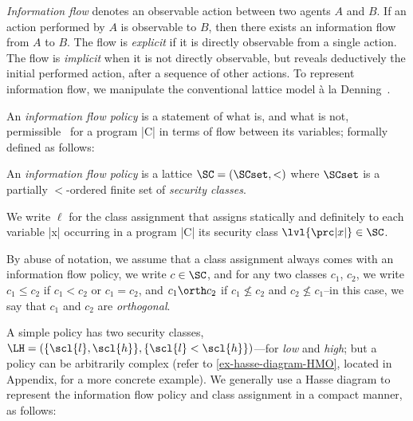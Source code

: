 \emph{Information flow} denotes an observable action between two agents \(A\) and \(B\).
If an action performed by \(A\) is observable to \(B\), then there exists an information flow from \(A\) to \(B\).
The flow is \emph{explicit} if it is directly observable from a single action.
The flow is \emph{implicit} when it is not directly observable, but reveals deductively the initial performed action, after a sequence of other actions.
To represent information flow, we manipulate the conventional lattice model à la Denning~\cite{Denning76}.

An \emph{information flow policy} is a statement of what is, and what is not, permissible~\cite{bishop2003} for a program \prc|C| in terms of flow between its variables; formally defined as follows: %

\begin{definition}%
\label{def:ifp}
An \emph{information flow policy} is a lattice \(\SC = (\SCset, <)\) where \(\SCset\) is a partially \(<\)-ordered finite set of \emph{security classes}.

We write \(\ell\) for the class assignment that assigns statically and definitely to each variable \prc|x| occurring in a program \prc|C| its security class \(\lvl{\prc|x|} \in \SC\).
\end{definition}

By abuse of notation, we assume that a class assignment always comes with an information flow policy, we write \(c \in \SC\), and for any two classes \(c_1\), \(c_2\), we write \(c_1 \leqslant c_2\) if \(c_1 < c_2\) or \(c_1 = c_2\), and \(c_1 \orth c_2\) if  \(c_1 \nleqslant c_2\) and \(c_2 \nleqslant c_1\)--in this case, we say that \(c_1\) and \(c_2\) are \emph{orthogonal}. %

A simple policy has two security classes, \eg \(\LH=(\{\scl{l}, \scl{h}\}, \{\scl{l} < \scl{h}\})\)---for \emph{low} and \emph{high}; but a policy can be arbitrarily complex (refer to \autoref{ex-hasse-diagram-HMO}, located in Appendix, for a more concrete example).
We generally use a Hasse diagram to represent the information flow policy and class assignment in a compact manner, as follows:

